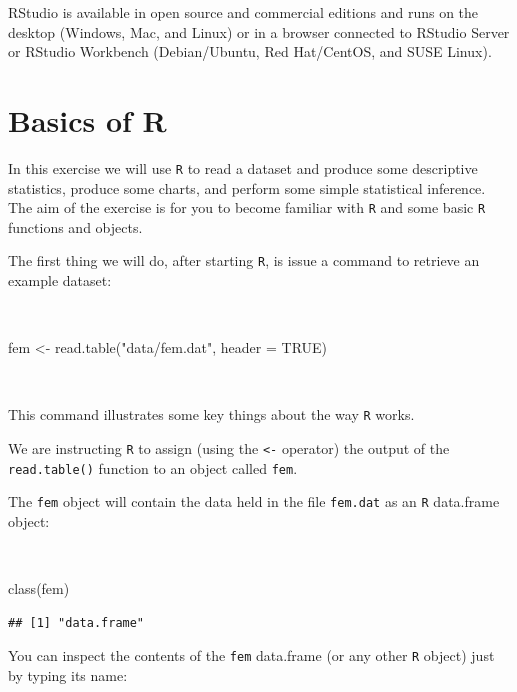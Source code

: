 \documentclass[
  12pt,
]{book}
\newenvironment{Shaded}{\begin{snugshade}}{\end{snugshade}}
\newcommand{\AttributeTok}[1]{\textcolor[rgb]{0.77,0.63,0.00}{#1}}
\newcommand{\ConstantTok}[1]{\textcolor[rgb]{0.00,0.00,0.00}{#1}}
\newcommand{\FunctionTok}[1]{\textcolor[rgb]{0.00,0.00,0.00}{#1}}
\newcommand{\NormalTok}[1]{#1}
\newcommand{\OtherTok}[1]{\textcolor[rgb]{0.56,0.35,0.01}{#1}}
\newcommand{\StringTok}[1]{\textcolor[rgb]{0.31,0.60,0.02}{#1}}
\begin{document}
RStudio is available in open source and commercial editions and runs on the desktop (Windows, Mac, and Linux) or in a browser connected to RStudio Server or RStudio Workbench (Debian/Ubuntu, Red Hat/CentOS, and SUSE Linux).

\hypertarget{basics-r}{%
\chapter{Basics of R}\label{basics-r}}

In this exercise we will use \texttt{R} to read a dataset and produce some descriptive statistics, produce some charts, and perform some simple statistical inference. The aim of the exercise is for you to become familiar with \texttt{R} and some basic \texttt{R} functions and objects.

The first thing we will do, after starting \texttt{R}, is issue a command to retrieve an example dataset:

~

\begin{Shaded}
\begin{Highlighting}[]
\NormalTok{fem }\OtherTok{\textless{}{-}} \FunctionTok{read.table}\NormalTok{(}\StringTok{"data/fem.dat"}\NormalTok{, }\AttributeTok{header =} \ConstantTok{TRUE}\NormalTok{)}
\end{Highlighting}
\end{Shaded}

~

This command illustrates some key things about the way \texttt{R} works.

We are instructing \texttt{R} to assign (using the \texttt{\textless{}-} operator) the output of the \texttt{read.table()} function to an object
called \texttt{fem}.

The \texttt{fem} object will contain the data held in the file \texttt{fem.dat} as an \texttt{R} data.frame object:

~

\begin{Shaded}
\begin{Highlighting}[]
\FunctionTok{class}\NormalTok{(fem)}
\end{Highlighting}
\end{Shaded}

\begin{verbatim}
## [1] "data.frame"
\end{verbatim}

\newpage

You can inspect the contents of the \texttt{fem} data.frame (or any other \texttt{R} object) just by typing its name:
\end{document}

